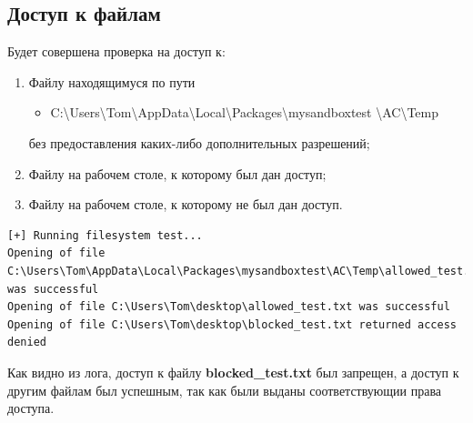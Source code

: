 \subsection{Доступ к файлам}
Будет совершена проверка на доступ к:
\begin{enumerate}
\item Файлу находящимуся по пути
\begin{itemize}
\item C:\textbackslash Users\textbackslash Tom\textbackslash AppData\textbackslash Local\textbackslash Packages\textbackslash mysandboxtest \textbackslash AC\textbackslash Temp
\end{itemize} 
без предоставления каких-либо дополнительных разрешений;
\item Файлу на рабочем столе, к которому был дан доступ;
\item Файлу на рабочем столе, к которому не был дан доступ.
\end{enumerate}

\begin{lstlisting}[language={}, caption={Результат проверки}]
[+] Running filesystem test...
Opening of file C:\Users\Tom\AppData\Local\Packages\mysandboxtest\AC\Temp\allowed_test.txt was successful
Opening of file C:\Users\Tom\desktop\allowed_test.txt was successful
Opening of file C:\Users\Tom\desktop\blocked_test.txt returned access denied
\end{lstlisting}
Как видно из лога, доступ к файлу \textbf{blocked\_test.txt} был запрещен, а доступ к другим файлам был успешным, так как были выданы соответствующии права доступа.

